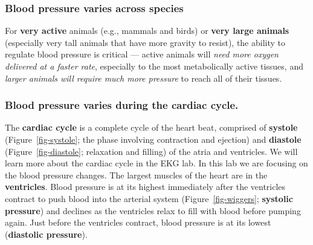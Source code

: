 \documentclass[
  letterpaper,
  DIV=11,
  numbers=noendperiod,
  oneside]{scrartcl}
\begin{document}
\hypertarget{blood-pressure-varies-across-species}{%
\subsubsection{Blood pressure varies across
species}\label{blood-pressure-varies-across-species}}

For \textbf{very active} animals (e.g., mammals and birds) or
\textbf{very large animals} (especially very tall animals that have more
gravity to resist), the ability to regulate blood pressure is critical
--- active animals will \emph{need more oxygen delivered at a faster
rate}, especially to the most metabolically active tissues, and
\emph{larger animals will require much more pressure} to reach all of
their tissues.

\hypertarget{blood-pressure-varies-during-the-cardiac-cycle.}{%
\subsubsection{Blood pressure varies during the cardiac
cycle.}\label{blood-pressure-varies-during-the-cardiac-cycle.}}

The \textbf{cardiac cycle} is a complete cycle of the heart beat,
comprised of \textbf{systole} (Figure~\ref{fig-systole}; the phase
involving contraction and ejection) and \textbf{diastole}
(Figure~\ref{fig-diastole}; relaxation and filling) of the atria and
ventricles. We will learn more about the cardiac cycle in the EKG lab.
In this lab we are focusing on the blood pressure changes. The largest
muscles of the heart are in the \textbf{ventricles}. Blood pressure is
at its highest immediately after the ventricles contract to push blood
into the arterial system (Figure~\ref{fig-wiggers}; \textbf{systolic
pressure}) and declines as the ventricles relax to fill with blood
before pumping again. Just before the ventricles contract, blood
pressure is at its lowest (\textbf{diastolic pressure}).
\end{document}

